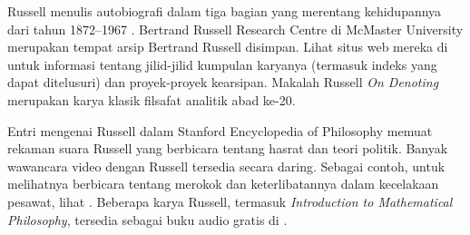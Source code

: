\documentclass[../../../include/open-logic-section]{subfiles}
\begin{document}
\begin{reading}
Russell menulis autobiografi dalam tiga bagian yang merentang kehidupannya
dari tahun 1872--1967 \citep{Russell1967,Russell1968,Russell1969}. Bertrand
Russell Research Centre di McMaster University merupakan tempat arsip
Bertrand Russell disimpan. Lihat situs web mereka di \citet{Duncan2015}
untuk informasi tentang jilid-jilid kumpulan karyanya (termasuk indeks yang
dapat ditelusuri) dan proyek-proyek kearsipan. Makalah Russell \emph{On
  Denoting} \citep{Russell1905} merupakan karya klasik filsafat analitik abad
ke-20.

Entri mengenai Russell dalam Stanford Encyclopedia of Philosophy
\citep{Irvine2015} memuat rekaman suara Russell yang berbicara tentang hasrat
dan teori politik. Banyak wawancara video dengan Russell tersedia secara
daring. Sebagai contoh, untuk melihatnya berbicara tentang merokok dan
keterlibatannya dalam kecelakaan pesawat, lihat \citet{RussellND}. Beberapa
karya Russell, termasuk \emph{Introduction to Mathematical Philosophy},
tersedia sebagai buku audio gratis di \citet{LibriVoxND}.
\end{reading}
\end{document}
